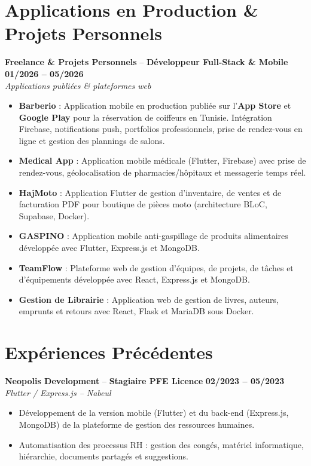 \documentclass[10pt,a4paper]{article}
\newcommand{\role}[4]{
  \vspace{3pt}
  \textbf{\color{primarydark}#1} -- \textbf{#2} \hfill {\color{textgray}\textbf{#3}}\\
  {\color{subgray}\textit{#4}}\vspace{1pt}
}
\begin{document}
\newpage

\section{Applications en Production \& Projets Personnels}

\role{Freelance \& Projets Personnels}{Développeur Full-Stack \& Mobile}{01/2026 -- 05/2026}{Applications publiées \& plateformes web}
\begin{itemize}
  \item \textbf{Barberio} : Application mobile en production publiée sur l'\textbf{App Store} et \textbf{Google Play} pour la réservation de coiffeurs en Tunisie. Intégration Firebase, notifications push, portfolios professionnels, prise de rendez-vous en ligne et gestion des plannings de salons.
  \item \textbf{Medical App} : Application mobile médicale (Flutter, Firebase) avec prise de rendez-vous, géolocalisation de pharmacies/hôpitaux et messagerie temps réel.
  \item \textbf{HajMoto} : Application Flutter de gestion d'inventaire, de ventes et de facturation PDF pour boutique de pièces moto (architecture BLoC, Supabase, Docker).
  \item \textbf{GASPINO} : Application mobile anti-gaspillage de produits alimentaires développée avec Flutter, Express.js et MongoDB.
  \item \textbf{TeamFlow} : Plateforme web de gestion d'équipes, de projets, de tâches et d'équipements développée avec React, Express.js et MongoDB.
  \item \textbf{Gestion de Librairie} : Application web de gestion de livres, auteurs, emprunts et retours avec React, Flask et MariaDB sous Docker.
\end{itemize}

\vspace{3pt}
\section{Expériences Précédentes}

\role{Neopolis Development}{Stagiaire PFE Licence}{02/2023 -- 05/2023}{Flutter / Express.js -- Nabeul}
\begin{itemize}
  \item Développement de la version mobile (Flutter) et du back-end (Express.js, MongoDB) de la plateforme de gestion des ressources humaines.
  \item Automatisation des processus RH : gestion des congés, matériel informatique, hiérarchie, documents partagés et suggestions.
\end{itemize}
\end{document}
